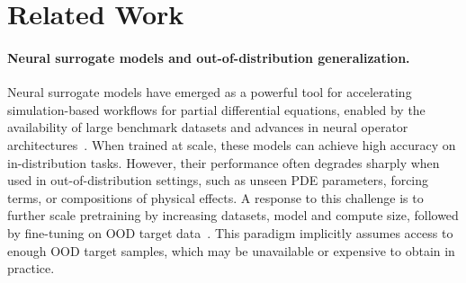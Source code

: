 \documentclass{article}
\newcommand{\ram}[1] {\textcolor{purple}{[RM. #1]}}
\theoremstyle{plain}
\theoremstyle{definition}
\theoremstyle{remark}
\begin{document}
\section{Related Work}


\paragraph{Neural surrogate models and out-of-distribution generalization.}
Neural surrogate models have emerged as a powerful tool for accelerating simulation-based workflows for partial differential equations, enabled by the availability of large benchmark datasets and advances in neural operator architectures~\citep{takamoto2022pdebench,ohana2024well,koehler2024apebench,mccabe2023multiple,hao2024dpot, morel2025disco}. When trained at scale, these models can achieve high accuracy on in-distribution tasks. However, their performance often degrades sharply when used in out-of-distribution settings, such as unseen PDE parameters, forcing terms, or compositions of physical effects. 
A response to this challenge is to further scale pretraining by increasing datasets, model and compute size, followed by fine-tuning on OOD target data~\citep{herde2024poseidon, NCWNO, mccabe2025walrus}.
This paradigm implicitly assumes access to enough OOD target samples, which may be unavailable or expensive to obtain in practice.


\end{document}
